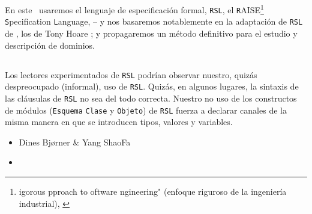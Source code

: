 \treprikker

\noindent
\pind En este \manual\ usaremos
\begynd 
\pind el lenguaje de especificación formal, \texttt{RSL},
\pind el \texttt{R}AISE\footnote{igorous
      pproach \ysfchgii{ }
      to  oftware ngineering" (enfoque riguroso de la ingeniería industrial), %
      \cite{RaiseMethod}} \texttt{S}pecification 
      \texttt{L}anguage, \cite{RSL} -- 
\pind y nos basaremos notablemente en la adaptación de \texttt{RSL} de , los
       de Tony Hoare \citecsp;
\pind y propagaremos un método definitivo para el estudio y
      descripción de dominios.
\afslut
\afslut

\subsection*{} 


\subsection*{}

Los lectores experimentados de \texttt{RSL} \cite{RSL} podrían observar nuestro,
quizás despreocupado (informal), uso de \texttt{RSL}. Quizás, en algunos lugares, la 
sintaxis de las cláusulas de \texttt{RSL} no sea del todo correcta. Nuestro no uso
de los constructos de módulos (\texttt{Esquema}\ysfchg{, } \texttt{Clase} y \texttt{Objeto})
de \texttt{RSL}  fuerza a declarar \textsf{canal}es de la misma manera
en que se introducen \textsf{tipo}s, \textsf{valor}es y \textsf{variable}s.

\begin{itemize}

\item[] \hfill   Dines Bj{\o}rner \& Yang ShaoFa

\item[] \hfill \todaytime
\end{itemize}


